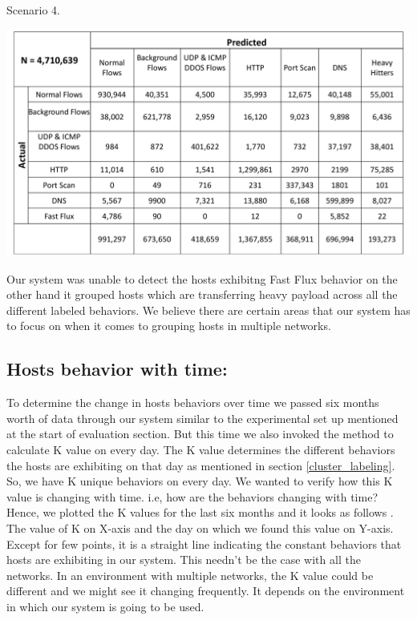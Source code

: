 \begin{table}[b]
	\caption{Scenario 4.}%
	\centerline{\includegraphics[scale = 0.45]{scenario4.pdf}}	
\end{table}

Our system was unable to detect the hosts exhibitng Fast Flux behavior on the other hand it grouped hosts which are transferring heavy payload across all the different labeled behaviors. We believe there are certain areas that our system has to focus on when it comes to grouping hosts in multiple networks.


\subsection{Hosts behavior with time:}

To determine the change in hosts behaviors over time we passed six months worth of data through our system similar to the experimental set up mentioned at the start of evaluation section. But this time we also invoked the method to calculate K value on every day. The K value determines the different behaviors the hosts are exhibiting on that day as mentioned in section \ref{cluster_labeling}. So, we have K unique behaviors on every day. We wanted to verify how this K value is changing with time. i.e, how are the behaviors changing with time? Hence, we plotted the K values for the last six months and it looks as follows . The value of K on X-axis and the day on which we found this value on Y-axis. Except for few points, it is a straight line indicating the constant behaviors that hosts are exhibiting in our system. This needn't be the case with all the networks. In an environment with multiple networks, the K value could be different and we might see it changing frequently. It depends on the environment in which our system is going to be used.

